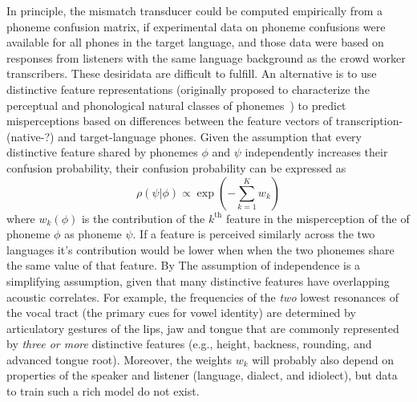 In principle, the mismatch transducer could be computed empirically from
a phoneme confusion matrix, if experimental data on phoneme confusions
were available for all phones in the target language, and those data
were based on responses from listeners with the same language background
as the crowd worker transcribers. These desiridata are difficult to
fulfill. An alternative is to use distinctive feature representations
(originally proposed to characterize the perceptual and phonological
natural classes of phonemes~\cite{Jakobson52}) to predict misperceptions
based on differences between the feature vectors of transcription-(native-?) and
target-language phones. Given the assumption that every distinctive
feature shared by phonemes $\phi$ and $\psi$ independently increases
their confusion probability, their confusion probability can be
expressed as
\begin{equation}
  \rho(\psi|\phi)\propto \exp\left(-\sum_{k=1}^K
  w_k\right)
  \label{eq:dfdist}
\end{equation}
where $w_k(\phi)$ is the contribution of the $k^{\textrm{th}}$ feature in the 
misperception of the of phoneme $\phi$ as phoneme $\psi$. If a feature is 
perceived similarly across the two languages it's contribution would be 
lower when when the two phonemes share the same value of that 
feature. By The assumption of independence is a simplifying assumption,
given that many distinctive features have overlapping acoustic
correlates. For example, the frequencies of the {\em two} lowest
resonances of the vocal tract (the primary cues for vowel identity) are
determined by articulatory gestures of the lips, jaw and tongue that are
commonly represented by {\em three or more} distinctive features
(e.g., height, backness, rounding, and advanced tongue root). Moreover,
the weights $w_k$ will probably also depend on properties of the speaker
and listener (language, dialect, and idiolect), but data to train such a
rich model do not exist.

